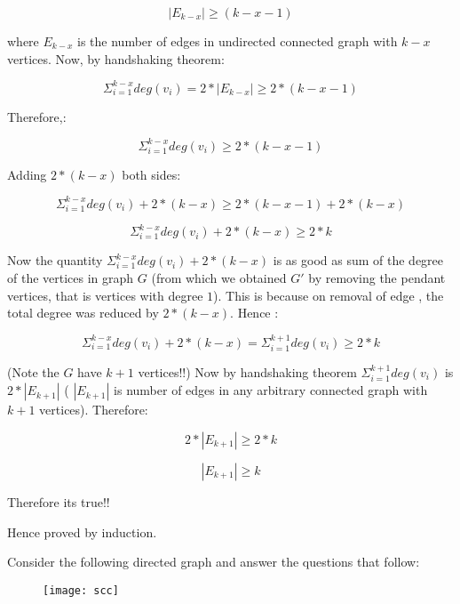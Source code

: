 \documentclass[answers]{exam}
\begin{document}
\begin{questions}
\begin{solution}
$$|E_{k-x}|\geq(k-x-1)$$

where $E_{k-x}$ is the number of edges in undirected connected graph with $k-x$ vertices. Now, by handshaking theorem:

$$\Sigma_{i=1}^{k-x} deg(v_i) =2*|E_{k-x}|\geq2*(k-x-1)$$

Therefore,:

$$\Sigma_{i=1}^{k-x} deg(v_i) \geq2*(k-x-1)$$

Adding $2*(k-x)$ both sides:

$$\Sigma_{i=1}^{k-x} deg(v_i) +2*(k-x)\geq2*(k-x-1)+2*(k-x)$$

$$\Sigma_{i=1}^{k-x} deg(v_i) +2*(k-x)\geq2*k$$

Now the quantity $\Sigma_{i=1}^{k-x} deg(v_i) +2*(k-x)$ is as good as sum of the degree of the vertices in graph $G$ (from which we obtained $G'$ by removing the pendant vertices, that is vertices with degree $1$). This is because on removal of edge , the total degree was reduced by $2*(k-x)$. Hence :

$$\Sigma_{i=1}^{k-x} deg(v_i) +2*(k-x)=\Sigma_{i=1}^{k+1} deg(v_i)\geq2*k$$

(Note the $G$ have $k+1$ vertices!!)
Now by handshaking theorem $\Sigma_{i=1}^{k+1} deg(v_i)$ is $2*|E_{k+1}|$ ( $|E_{k+1}|$ is number of edges in any arbitrary connected graph with $k+1$ vertices). Therefore:

$$2*|E_{k+1}|\geq2*k$$

$$|E_{k+1}|\geq k$$  

Therefore its true!!


Hence proved by induction.

\end{solution}







\vspace{0.3in}




\question  Consider the following directed graph and answer the questions that follow:

\begin{figure}[h]
\centering
\texttt{[image: scc]}
\end{figure}

\end{questions}
\end{document}
